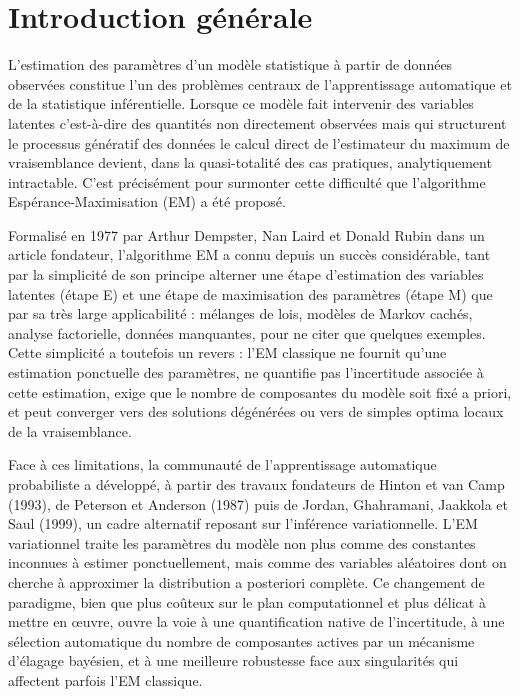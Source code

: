 \chapter*{Introduction générale}
L'estimation des paramètres d'un modèle statistique à partir de données observées constitue l'un des problèmes centraux de l'apprentissage automatique et de la statistique inférentielle. Lorsque ce modèle fait intervenir des variables latentes  c'est-à-dire des quantités non directement observées mais qui structurent le processus génératif des données  le calcul direct de l'estimateur du maximum de vraisemblance devient, dans la quasi-totalité des cas pratiques, analytiquement intractable. C'est précisément pour surmonter cette difficulté que l'algorithme Espérance-Maximisation (EM) a été proposé.

Formalisé en 1977 par Arthur Dempster, Nan Laird et Donald Rubin dans un article fondateur, l'algorithme EM a connu depuis un succès considérable, tant par la simplicité de son principe  alterner une étape d'estimation des variables latentes (étape E) et une étape de maximisation des paramètres (étape M)  que par sa très large applicabilité : mélanges de lois, modèles de Markov cachés, analyse factorielle, données manquantes, pour ne citer que quelques exemples. Cette simplicité a toutefois un revers : l'EM classique ne fournit qu'une estimation ponctuelle des paramètres, ne quantifie pas l'incertitude associée à cette estimation, exige que le nombre de composantes du modèle soit fixé a priori, et peut converger vers des solutions dégénérées ou vers de simples optima locaux de la vraisemblance.

Face à ces limitations, la communauté de l'apprentissage automatique probabiliste a développé, à partir des travaux fondateurs de Hinton et van Camp (1993), de Peterson et Anderson (1987) puis de Jordan, Ghahramani, Jaakkola et Saul (1999), un cadre alternatif reposant sur l'inférence variationnelle. L'EM variationnel traite les paramètres du modèle non plus comme des constantes inconnues à estimer ponctuellement, mais comme des variables aléatoires dont on cherche à approximer la distribution a posteriori complète. Ce changement de paradigme, bien que plus coûteux sur le plan computationnel et plus délicat à mettre en œuvre, ouvre la voie à une quantification native de l'incertitude, à une sélection automatique du nombre de composantes actives par un mécanisme d'élagage bayésien, et à une meilleure robustesse face aux singularités qui affectent parfois l'EM classique.

